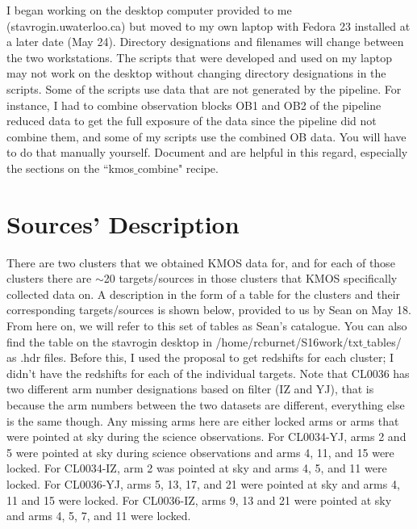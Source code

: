 \documentclass[10pt,letterpaper]{article}
\begin{document}
I began working on the desktop computer provided to me (stavrogin.uwaterloo.ca) but moved to my own laptop with Fedora 23 installed at a later date (May 24). Directory designations and filenames will change between the two workstations. The scripts that were developed and used on my laptop may not work on the desktop without changing directory designations in the scripts. Some of the scripts use data that are not generated by the pipeline. For instance, I had to combine observation blocks OB1 and OB2 of the pipeline reduced data to get the full exposure of the data since the pipeline did not combine them, and some of my scripts use the combined OB data. You will have to do that manually yourself. Document \cite{KMOS pipeline manual} and \cite{KMOS pipeline cookbook} are helpful in this regard, especially the sections on the ``kmos$\_$combine" recipe.\\

\newpage

\section{Sources' Description}
\label{sec:sources}
There are two clusters that we obtained KMOS data for, and for each of those clusters there are $\sim$20 targets/sources in those clusters that KMOS specifically collected data on. A description in the form of a table for the clusters and their corresponding targets/sources is shown below, provided to us by Sean on May 18. From here on, we will refer to this set of tables as Sean's catalogue. You can also find the table on the stavrogin desktop in /home/rcburnet/S16work/txt$\_$tables/ as .hdr files. Before this, I used the proposal to get redshifts for each cluster; I didn't have the redshifts for each of the individual targets. Note that CL0036 has two different arm number designations based on filter (IZ and YJ), that is because the arm numbers between the two datasets are different, everything else is the same though. Any missing arms here are either locked arms or arms that were pointed at sky during the science observations. For CL0034-YJ, arms 2 and 5 were pointed at sky during science observations and arms 4, 11, and 15 were locked. For CL0034-IZ, arm 2 was pointed at sky and arms 4, 5, and 11 were locked. For CL0036-YJ, arms 5, 13, 17, and 21 were pointed at sky and arms 4, 11 and 15 were locked. For CL0036-IZ, arms 9, 13 and 21 were pointed at sky and arms 4, 5, 7, and 11 were locked.\\
\end{document}
